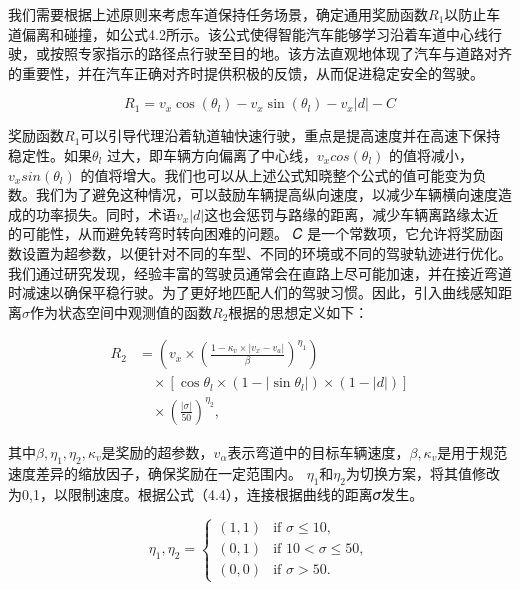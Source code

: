 我们需要根据上述原则来考虑车道保持任务场景，确定通用奖励函数\(𝑅_1\)以防止车道偏离和碰撞，如公式4.2所示。该公式使得智能汽车能够学习沿着车道中心线行驶，或按照专家指示的路径点行驶至目的地。该方法直观地体现了汽车与道路对齐的重要性，并在汽车正确对齐时提供积极的反馈，从而促进稳定安全的驾驶。

\begin{equation}
	R_1 = v_x \cos(\theta_l) - v_x \sin(\theta_l) - v_x \lvert d \rvert - C
\end{equation}

奖励函数\(𝑅_1\)可以引导代理沿着轨道轴快速行驶，重点是提高速度并在高速下保持稳定性。如果\(𝜃_𝑙\) 过大，即车辆方向偏离了中心线，\(𝑣_𝑥 cos(𝜃_𝑙)\) 的值将减小，\(𝑣_𝑥 sin(𝜃_𝑙)\) 的值将增大。我们也可以从上述公式知晓整个公式的值可能变为负数。我们为了避免这种情况，可以鼓励车辆提高纵向速度，以减少车辆横向速度造成的功率损失。同时，术语\(𝑣_𝑥|𝑑|\)这也会惩罚与路缘的距离，减少车辆离路缘太近的可能性，从而避免转弯时转向困难的问题。 𝐶 是一个常数项，它允许将奖励函数设置为超参数，以便针对不同的车型、不同的环境或不同的驾驶轨迹进行优化。我们通过研究发现，经验丰富的驾驶员通常会在直路上尽可能加速，并在接近弯道时减速以确保平稳行驶。为了更好地匹配人们的驾驶习惯。因此，引入曲线感知距离\(𝜎\)作为状态空间中观测值的函数\(𝑅_2\)根据\cite{zou2021deep}的思想定义如下：

\begin{equation}
	\begin{split}
		R_2 &= \left( v_x \times \left( \frac{1 - \kappa_v \times \lvert v_x - v_a \rvert}{\beta} \right)^{\eta_1} \right) \\
		&\quad \times \left[ \cos \theta_l \times (1 - \lvert \sin \theta_l \rvert) \times (1 - \lvert d \rvert) \right] \\
		&\quad \times \left( \frac{\lvert \sigma \rvert}{50} \right)^{\eta_2},
	\end{split}
\end{equation}

其中\(𝛽,𝜂_1,𝜂_2,𝜅_𝑣\)是奖励的超参数，\(𝑣_𝛼\)表示弯道中的目标车辆速度，\(𝛽,𝜅_𝑣\)是用于规范速度差异的缩放因子，确保奖励在一定范围内。 \(𝜂_1\)和\(𝜂_2\)为切换方案，将其值修改为{0,1}，以限制速度。根据公式（4.4），连接根据曲线的距离𝜎发生。

\begin{equation}
	\eta_1, \eta_2 = 
	\begin{cases} 
		(1, 1) & \text{if } \sigma \leq 10, \\ 
		(0, 1) & \text{if } 10 < \sigma \leq 50, \\ 
		(0, 0) & \text{if } \sigma > 50. 
	\end{cases}
\end{equation}

